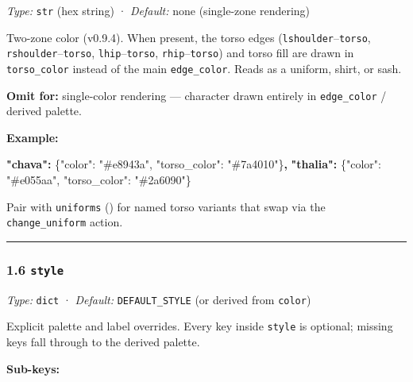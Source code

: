 \documentclass[
  11pt,
]{book}
\newenvironment{Shaded}{}{}
\newcommand{\DataTypeTok}[1]{\textcolor[rgb]{0.56,0.13,0.00}{#1}}
\newcommand{\ErrorTok}[1]{\textcolor[rgb]{1.00,0.00,0.00}{\textbf{#1}}}
\newcommand{\FunctionTok}[1]{\textcolor[rgb]{0.02,0.16,0.49}{#1}}
\newcommand{\StringTok}[1]{\textcolor[rgb]{0.25,0.44,0.63}{#1}}
\begin{document}
\emph{Type:} \texttt{str} (hex string) · \emph{Default:} none
(single-zone rendering)

Two-zone color (v0.9.4). When present, the torso edges
(\texttt{lshoulder}--\texttt{torso}, \texttt{rshoulder}--\texttt{torso},
\texttt{lhip}--\texttt{torso}, \texttt{rhip}--\texttt{torso}) and torso
fill are drawn in \texttt{torso\_color} instead of the main
\texttt{edge\_color}. Reads as a uniform, shirt, or sash.

\textbf{Omit for:} single-color rendering --- character drawn entirely
in \texttt{edge\_color} / derived palette.

\textbf{Example:}

\begin{Shaded}
\begin{Highlighting}[]
\ErrorTok{"chava":}  \FunctionTok{\{}\DataTypeTok{"color"}\FunctionTok{:} \StringTok{"\#e8943a"}\FunctionTok{,} \DataTypeTok{"torso\_color"}\FunctionTok{:} \StringTok{"\#7a4010"}\FunctionTok{\}}\ErrorTok{,}
\ErrorTok{"thalia":} \FunctionTok{\{}\DataTypeTok{"color"}\FunctionTok{:} \StringTok{"\#e055aa"}\FunctionTok{,} \DataTypeTok{"torso\_color"}\FunctionTok{:} \StringTok{"\#2a6090"}\FunctionTok{\}}
\end{Highlighting}
\end{Shaded}

Pair with \texttt{uniforms} (\cite{uniforms}) for named
torso variants that swap via the \texttt{change\_uniform} action.

\begin{center}\rule{0.5\linewidth}{0.5pt}\end{center}

\subsubsection{\texorpdfstring{1.6
\texttt{style}}{1.6 style}}\label{style}

\emph{Type:} \texttt{dict} · \emph{Default:} \texttt{DEFAULT\_STYLE} (or
derived from \texttt{color})

Explicit palette and label overrides. Every key inside \texttt{style} is
optional; missing keys fall through to the derived palette.

\textbf{Sub-keys:}
\end{document}
